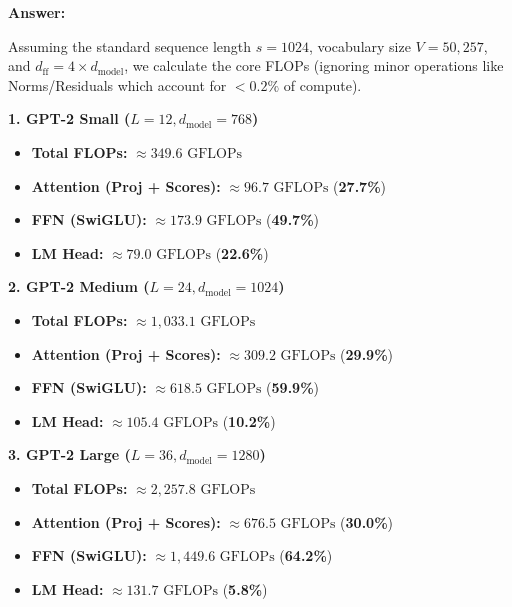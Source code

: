 \begin{answerbox}
    \textbf{Answer:}

    Assuming the standard sequence length $s = 1024$, vocabulary size $V = 50,257$, and $d_{\mathrm{ff}} = 4 \times d_{\mathrm{model}}$, we calculate the core FLOPs (ignoring minor operations like Norms/Residuals which account for $<0.2\%$ of compute).

    \vspace{0.5em}
    \textbf{1. GPT-2 Small ($L=12, d_{\mathrm{model}}=768$)}
    \begin{itemize}[itemsep=0.2em, parsep=0pt, topsep=0.2em]
        \item \textbf{Total FLOPs:} $\approx 349.6 \text{ GFLOPs}$
        \item \textbf{Attention (Proj + Scores):} $\approx 96.7 \text{ GFLOPs}$ (\textbf{27.7\%})
        \item \textbf{FFN (SwiGLU):} $\approx 173.9 \text{ GFLOPs}$ (\textbf{49.7\%})
        \item \textbf{LM Head:} $\approx 79.0 \text{ GFLOPs}$ (\textbf{22.6\%})
    \end{itemize}

    \vspace{0.5em}
    \textbf{2. GPT-2 Medium ($L=24, d_{\mathrm{model}}=1024$)}
    \begin{itemize}[itemsep=0.2em, parsep=0pt, topsep=0.2em]
        \item \textbf{Total FLOPs:} $\approx 1,033.1 \text{ GFLOPs}$
        \item \textbf{Attention (Proj + Scores):} $\approx 309.2 \text{ GFLOPs}$ (\textbf{29.9\%})
        \item \textbf{FFN (SwiGLU):} $\approx 618.5 \text{ GFLOPs}$ (\textbf{59.9\%})
        \item \textbf{LM Head:} $\approx 105.4 \text{ GFLOPs}$ (\textbf{10.2\%})
    \end{itemize}

    \vspace{0.5em}
    \textbf{3. GPT-2 Large ($L=36, d_{\mathrm{model}}=1280$)}
    \begin{itemize}[itemsep=0.2em, parsep=0pt, topsep=0.2em]
        \item \textbf{Total FLOPs:} $\approx 2,257.8 \text{ GFLOPs}$
        \item \textbf{Attention (Proj + Scores):} $\approx 676.5 \text{ GFLOPs}$ (\textbf{30.0\%})
        \item \textbf{FFN (SwiGLU):} $\approx 1,449.6 \text{ GFLOPs}$ (\textbf{64.2\%})
        \item \textbf{LM Head:} $\approx 131.7 \text{ GFLOPs}$ (\textbf{5.8\%})
    \end{itemize}


\end{answerbox}
